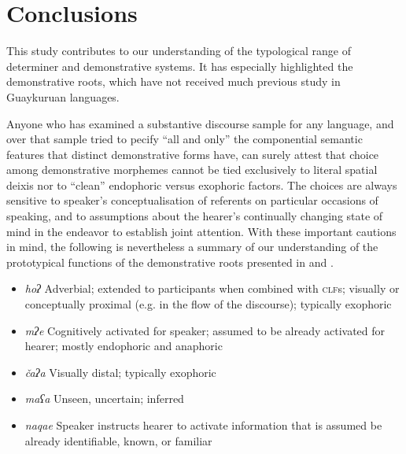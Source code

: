 \documentclass[output=paper,colorlinks,citecolor=brown]{langscibook}
\begin{document}
\section{Conclusions}\label{sec:payne:8}

This study contributes to our understanding of the typological range of determiner and demonstrative systems. It has especially highlighted the demonstrative roots, which have not received much previous study in Guaykuruan languages.

Anyone who has examined a substantive discourse sample for any language, and over that sample tried to pecify “all and only” the componential semantic features that distinct demonstrative forms have, can surely attest that choice among demonstrative morphemes cannot be tied exclusively to literal spatial deixis nor to “clean” endophoric versus exophoric factors. The choices are always sensitive to speaker’s conceptualisation of referents on particular occasions of speaking, and to assumptions about the hearer’s continually changing state of mind in the endeavor to establish joint attention. With these important cautions in mind, the following is nevertheless a summary of our understanding of the prototypical functions of the demonstrative roots presented in  and .

\begin{itemize}
\item \textit{hoʔ}  Adverbial; extended to participants when combined with \textsc{clf}s; visually or conceptually proximal (e.g. in the flow of the discourse); typically exophoric
\item \textit{mʔe}  Cognitively activated for speaker; assumed to be already activated for hearer; mostly endophoric and anaphoric
\item \textit{čaʔa}  Visually distal; typically exophoric
\item \textit{maʕa}  Unseen, uncertain; inferred
\item \textit{naqae}  Speaker instructs hearer to activate information that is assumed be already identifiable, known, or familiar
\end{itemize}
\end{document}
